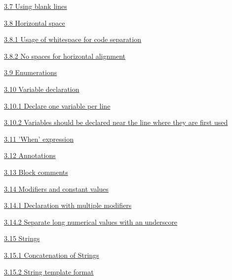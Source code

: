 {{{{{{{{{{{{{{{{\hspace{0.5cm}\hyperref[sec:3.7]{ 3.7 Using blank lines}

\hspace{0.5cm}\hyperref[sec:3.8]{ 3.8 Horizontal space}

\hspace{1.0cm}\hyperref[sec:3.8.1]{ 3.8.1 Usage of whitespace for code separation}

\hspace{1.0cm}\hyperref[sec:3.8.2]{ 3.8.2 No spaces for horizontal alignment}

\hspace{0.5cm}\hyperref[sec:3.9]{ 3.9 Enumerations}

\hspace{0.5cm}\hyperref[sec:3.10]{ 3.10 Variable declaration}

\hspace{1.0cm}\hyperref[sec:3.10.1]{ 3.10.1 Declare one variable per line}

\hspace{1.0cm}\hyperref[sec:3.10.2]{ 3.10.2 Variables should be declared near the line where they are first used}

\hspace{0.5cm}\hyperref[sec:3.11]{ 3.11 'When' expression}

\hspace{0.5cm}\hyperref[sec:3.12]{ 3.12 Annotations}

\hspace{0.5cm}\hyperref[sec:3.13]{ 3.13 Block comments}

\hspace{0.5cm}\hyperref[sec:3.14]{ 3.14 Modifiers and constant values}

\hspace{1.0cm}\hyperref[sec:3.14.1]{ 3.14.1 Declaration with multiple modifiers}

\hspace{1.0cm}\hyperref[sec:3.14.2]{ 3.14.2 Separate long numerical values with an underscore}

\hspace{1.0cm}\hyperref[sec:3.15]{ 3.15 Strings}

\hspace{1.0cm}\hyperref[sec:3.15.1]{ 3.15.1 Concatenation of Strings}

\hspace{1.0cm}\hyperref[sec:3.15.2]{ 3.15.2 String template format}

\hspace{0.0cm}\hyperref[sec:]{}

}}}}}}}}}}}}}}}}
